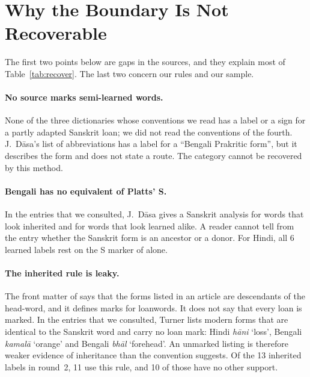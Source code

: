 \documentclass[11pt]{article}
\newcommand{\gl}[1]{`#1'}
\begin{document}
\section{Why the Boundary Is Not Recoverable}
\label{sec:why}

The first two points below are gaps in the sources, and they explain most of Table~\ref{tab:recover}. The last two concern our rules and our sample.

\paragraph{No source marks semi-learned words.} None of the three dictionaries whose conventions we read has a label or a sign for a partly adapted Sanskrit loan; we did not read the conventions of the fourth. J.~D\=asa's list of abbreviations has a label for a ``Bengali Prakritic form'', but it describes the form and does not state a route. The category cannot be recovered by this method.

\paragraph{Bengali has no equivalent of Platts' S.} In the entries that we consulted, J.~D\=asa gives a Sanskrit analysis for words that look inherited and for words that look learned alike. A reader cannot tell from the entry whether the Sanskrit form is an ancestor or a donor. For Hindi, all 6 learned labels rest on the S marker of \citet{platts1884} alone.

\paragraph{The inherited rule is leaky.} The front matter of \citet{turner1966cdial} says that the forms listed in an article are descendants of the head-word, and it defines marks for loanwords. It does not say that every loan is marked. In the entries that we consulted, Turner lists modern forms that are identical to the Sanskrit word and carry no loan mark: Hindi \textit{h\=ani} \gl{loss}, Bengali \textit{kamal\=a} \gl{orange} and Bengali \textit{bh\=al} \gl{forehead}. An unmarked listing is therefore weaker evidence of inheritance than the convention suggests. Of the 13 inherited labels in round~2, 11 use this rule, and 10 of those have no other support.
\end{document}
